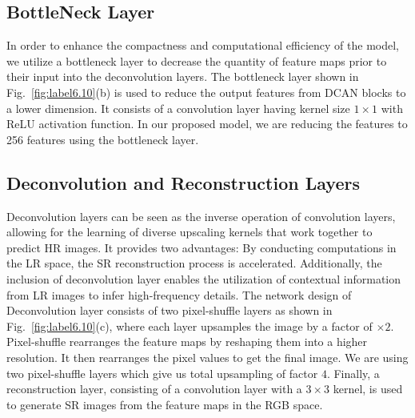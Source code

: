 \documentclass[conference]{IEEEtran}
\begin{document}
\subsection{BottleNeck Layer}
In order to enhance the compactness and computational efficiency of the model, we utilize a bottleneck layer to decrease the quantity of feature maps prior to their input into the deconvolution layers. The bottleneck layer shown in Fig.~\ref{fig:label6.10}(b) is used to reduce the output features from DCAN blocks to a lower dimension. It consists of a convolution layer having kernel size $1\times1$ with ReLU activation function. In our proposed model, we are reducing the features to 256 features using the bottleneck layer. 

\subsection{Deconvolution and Reconstruction Layers}
Deconvolution layers can be seen as the inverse operation of convolution layers, allowing for the learning of diverse upscaling kernels that work together to predict HR images. It provides two advantages: By conducting computations in the LR space, the SR reconstruction process is accelerated. %
Additionally, the inclusion of deconvolution layer enables the utilization of contextual information from LR images to infer high-frequency details.
The network design of Deconvolution layer consists of two pixel-shuffle layers as shown in Fig.~\ref{fig:label6.10}(c), where each layer upsamples the image by a factor of $\times2$. Pixel-shuffle rearranges the feature maps by reshaping them into a higher resolution. It then rearranges the pixel values to get the final image. We are using two pixel-shuffle layers which give us total  upsampling of factor $4$. %
Finally, a reconstruction layer, consisting of a convolution layer with a $3\times3$ kernel, is used to generate SR images from the feature maps in the RGB space.
\end{document}

